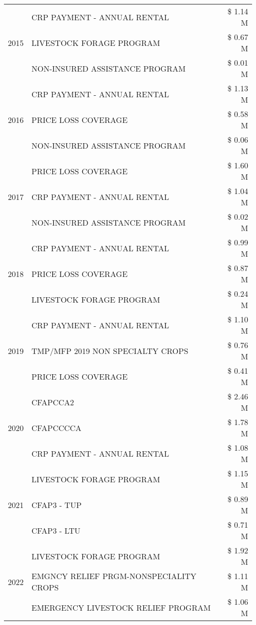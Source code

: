 \begin{tabular}{llr}
\cline{1-3}
\multirow[t]{3}{*}{2015} & CRP PAYMENT - ANNUAL RENTAL & \$ 1.14 M \\
 & LIVESTOCK FORAGE PROGRAM & \$ 0.67 M \\
 & NON-INSURED ASSISTANCE PROGRAM & \$ 0.01 M \\
\cline{1-3}
\multirow[t]{3}{*}{2016} & CRP PAYMENT - ANNUAL RENTAL & \$ 1.13 M \\
 & PRICE LOSS COVERAGE & \$ 0.58 M \\
 & NON-INSURED ASSISTANCE PROGRAM & \$ 0.06 M \\
\cline{1-3}
\multirow[t]{3}{*}{2017} & PRICE LOSS COVERAGE & \$ 1.60 M \\
 & CRP PAYMENT - ANNUAL RENTAL & \$ 1.04 M \\
 & NON-INSURED ASSISTANCE PROGRAM & \$ 0.02 M \\
\cline{1-3}
\multirow[t]{3}{*}{2018} & CRP PAYMENT - ANNUAL RENTAL & \$ 0.99 M \\
 & PRICE LOSS COVERAGE & \$ 0.87 M \\
 & LIVESTOCK FORAGE PROGRAM & \$ 0.24 M \\
\cline{1-3}
\multirow[t]{3}{*}{2019} & CRP PAYMENT - ANNUAL RENTAL & \$ 1.10 M \\
 & TMP/MFP 2019 NON SPECIALTY CROPS & \$ 0.76 M \\
 & PRICE LOSS COVERAGE & \$ 0.41 M \\
\cline{1-3}
\multirow[t]{3}{*}{2020} & CFAPCCA2 & \$ 2.46 M \\
 & CFAPCCCCA & \$ 1.78 M \\
 & CRP PAYMENT - ANNUAL RENTAL & \$ 1.08 M \\
\cline{1-3}
\multirow[t]{3}{*}{2021} & LIVESTOCK FORAGE PROGRAM & \$ 1.15 M \\
 & CFAP3 - TUP & \$ 0.89 M \\
 & CFAP3 - LTU & \$ 0.71 M \\
\cline{1-3}
\multirow[t]{3}{*}{2022} & LIVESTOCK FORAGE PROGRAM & \$ 1.92 M \\
 & EMGNCY RELIEF PRGM-NONSPECIALITY CROPS & \$ 1.11 M \\
 & EMERGENCY LIVESTOCK RELIEF PROGRAM & \$ 1.06 M \\
\cline{1-3}
\bottomrule
\end{tabular}
